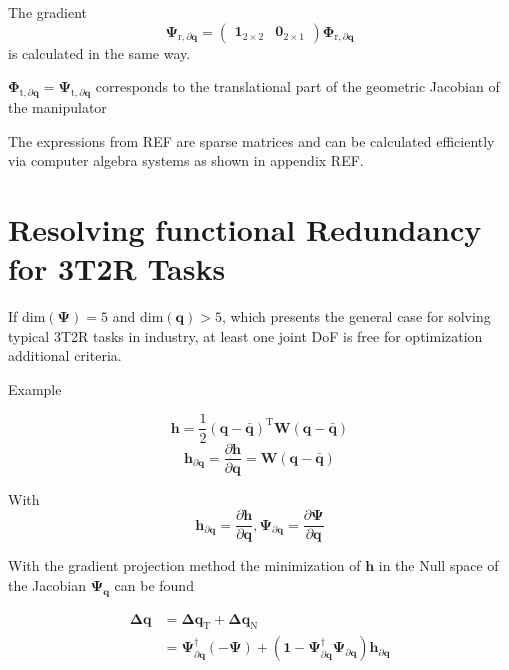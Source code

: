\documentclass[twocolumn,10pt]{IFTOMM}
\newcommand{\bm}[1]{\boldsymbol{#1}}
\newcommand{\transp}[0]{{\mathrm{T}}}
\begin{document}
The gradient
\begin{equation}
\bm{\Psi}_{\mathrm{r},\partial\bm{q}}
=
\begin{pmatrix} \bm{1}_{2 \times 2} & \bm{0}_{2 \times 1}\end{pmatrix} \bm{\Phi}_{\mathrm{r},\partial\bm{q}}
\end{equation}
is calculated in the same way.

$\bm{\Phi}_{\mathrm{t},\partial\bm{q}}=\bm{\Psi}_{\mathrm{t},\partial\bm{q}}$ corresponds to the translational part of the geometric Jacobian of the manipulator

The expressions from REF are sparse matrices and can be calculated efficiently via computer algebra systems as shown in appendix REF.


\section{Resolving functional Redundancy for 3T2R Tasks}
\label{sec:ResFuncRed}


If $\mathrm{dim}(\bm{\Psi})=5$ and $\mathrm{dim}(\bm{q})>5$, which presents the general case for solving typical 3T2R tasks in industry, at least one joint DoF is free for optimization additional criteria.

Example

\begin{equation}
\bm{h}
=
\frac{1}{2} (\bm{q}-\bar{\bm{q}})^\transp\bm{W}(\bm{q}-\bar{\bm{q}})
\end{equation}  
%
\begin{equation}
\bm{h}_{\partial\bm{q}}
=
\frac{\partial \bm{h}}{\partial \bm{q}}
=
\bm{W}(\bm{q}-\bar{\bm{q}})
\end{equation}

With
\begin{equation}
\bm{h}_{\partial\bm{q}}=\frac{\partial \bm{h}}{\partial \bm{q}},
\bm{\Psi}_{\partial\bm{q}}=\frac{\partial \bm{\Psi}}{\partial \bm{q}}
\end{equation}


With the gradient projection method the minimization of $\bm{h}$ in the Null space of the Jacobian $\bm{\Psi}_{\bm{q}}$ can be found

\begin{align}
\bm{\Delta}\bm{q}
&=
\bm{\Delta}\bm{q}_{\mathrm{T}} + \bm{\Delta}\bm{q}_{\mathrm{N}} \\
&=
\bm{\Psi}_{\partial\bm{q}}^{\dagger} (-\bm{\Psi}) + (\bm{1}-\bm{\Psi}_{\partial\bm{q}}^{\dagger}\bm{\Psi}_{\partial\bm{q}}) \bm{h}_{\partial\bm{q}}
\end{align}
\end{document}
